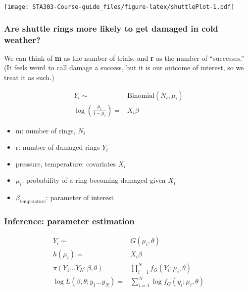 \documentclass[
  openany]{book}
\providecommand{\tightlist}{%
  \setlength{\itemsep}{0pt}\setlength{\parskip}{0pt}}
\begin{document}
\texttt{[image: STA303-Course-guide\_files/figure-latex/shuttlePlot-1.pdf]}

\hypertarget{are-shuttle-rings-more-likely-to-get-damaged-in-cold-weather}{%
\subsubsection{Are shuttle rings more likely to get damaged in cold weather?}\label{are-shuttle-rings-more-likely-to-get-damaged-in-cold-weather}}

We can think of \textbf{m} as the number of trials, and \textbf{r} as the number
of ``successes.'' (It feels weird to call damage a success, but it is our
outcome of interest, so we treat it as such.)

\begin{align*}
Y_i \sim & \text{Binomial}(N_i, \mu_i)\\
\log\left(\frac{\mu_i}{1-\mu_i}\right) = & X_i \beta
\end{align*}

\begin{itemize}
\tightlist
\item
  m: number of rings, \(N_i\)
\item
  r: number of damaged rings \(Y_i\)
\item
  pressure, temperature: covariates \(X_i\)
\item
  \(\mu_i\): probability of a ring becoming damaged given \(X_i\)
\item
  \(\beta_{\text{temperature}}\): parameter of interest
\end{itemize}

\hypertarget{inference-parameter-estimation}{%
\subsubsection{Inference: parameter estimation}\label{inference-parameter-estimation}}

\begin{align*}
Y_i \sim & G (\mu_i, \theta)\\
h(\mu_i) = & X_i \beta\\
\pi(Y_1 ... Y_N; \beta, \theta)  = & 
\prod_{i=1}^N f_G (Y_i ; \mu_i, \theta)\\
\log L(\beta, \theta ; y_1 ... y_N) = &
\sum_{i=1}^N \log f_G (y_i; \mu_i, \theta)
\end{align*}
\end{document}
